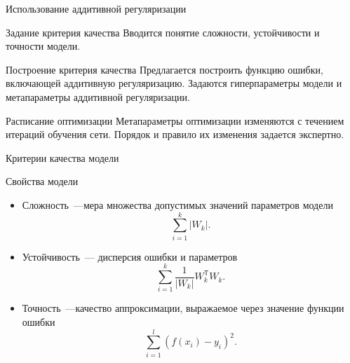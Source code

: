 \documentclass[9pt,pdf,hyperref={unicode}]{beamer}
\begin{document}
\begin{frame}{Использование аддитивной регуляризации}
\begin{block}{Задание критерия качества}
    Вводится понятие сложности, устойчивости и точности модели.
\end{block}
\begin{block}{Построение критерия качества}
    Предлагается построить функцию ошибки, включающей аддитивную регуляризацию. Задаются гиперпараметры модели и метапараметры аддитивной регуляризации.
\end{block}
\begin{block}{Расписание оптимизации}
    Метапараметры оптимизации изменяются с течением итераций обучения сети. Порядок и правило их изменения задается экспертно.
\end{block}


\end{frame}
\begin{frame}{Критерии качества модели}
\begin{block}{Свойства модели}
    \begin{itemize}
    \item
    Сложность~---мера множества допустимых значений параметров модели
    $$
    \sum\limits_{i=1}^k |W_k|.$$
    \item
    Устойчивость~--- дисперсия ошибки и параметров
    $$
    \sum\limits_{i=1}^k \frac{1}{|W_k|}W_k^\mathsf{T}W_k.$$ 
    \item 
    Точность~---качество аппроксимации, выражаемое через значение функции ошибки $$\sum_{i = 1} ^ l (f(x_i) - y_i)^2. $$
\end{itemize}
\end{block}


\end{frame}
\end{document}
